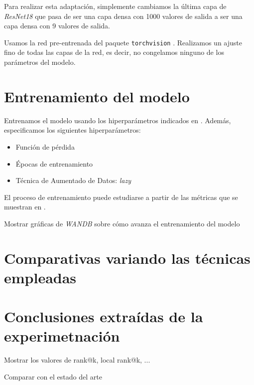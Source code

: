 Para realizar esta adaptación, simplemente cambiamos la última capa de \textit{ResNet18} que pasa de ser una capa densa con 1000 valores de salida a ser una capa densa con 9 valores de salida.

Usamos la red pre-entrenada del paquete \lstinline{torchvision} \cite{informatica:resnet18_torchvision}. Realizamos un ajuste fino de todas las capas de la red, es decir, no congelamos ninguno de los parámetros del modelo.



\section{Entrenamiento del modelo} \label{isec:entrenamiento_mejor_modelo}

Entrenamos el modelo usando los hiperparámetros indicados en . Además, especificamos los siguientes hiperparámetros:

\begin{itemize}
    \item Función de pérdida
    \item Épocas de entrenamiento
    \item Técnica de Aumentado de Datos: \textit{lazy}
\end{itemize}

El proceso de entrenamiento puede estudiarse a partir de las métricas que se muestran en .



Mostrar gráficas de \textit{WANDB} sobre cómo avanza el entrenamiento del modelo

\section{Comparativas variando las técnicas empleadas} \label{isec:experimentacion_variar_tecnicas}

\section{Conclusiones extraídas de la experimetnación} \label{isec:conclusiones_experimentacion}

Mostrar los valores de rank@k, local rank@k, ...

Comparar con el estado del arte
